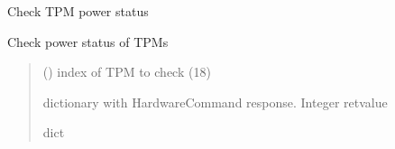 \documentclass[letterpaper,10pt,english]{sphinxmanual}
\begin{document}
\begin{fulllineitems}
\label{\detokenize{webserverdocs:subrack_hardware.IsTpmOnCommand}}
\pysigstartsignatures
{}
\pysigstopsignatures
\sphinxAtStartPar
Check TPM power status

\begin{fulllineitems}
\label{\detokenize{webserverdocs:subrack_hardware.IsTpmOnCommand.do}}
\pysigstartsignatures
{}
\pysigstopsignatures
\sphinxAtStartPar
Check power status of TPMs
\begin{quote}\begin{description}
\sphinxAtStartPar
{} () \textendash{} index of TPM to check (1\sphinxhyphen{}8)

\sphinxAtStartPar
dictionary with HardwareCommand response. Integer retvalue

\sphinxAtStartPar
dict

\end{description}\end{quote}

\end{fulllineitems}


\end{fulllineitems}

\end{document}
